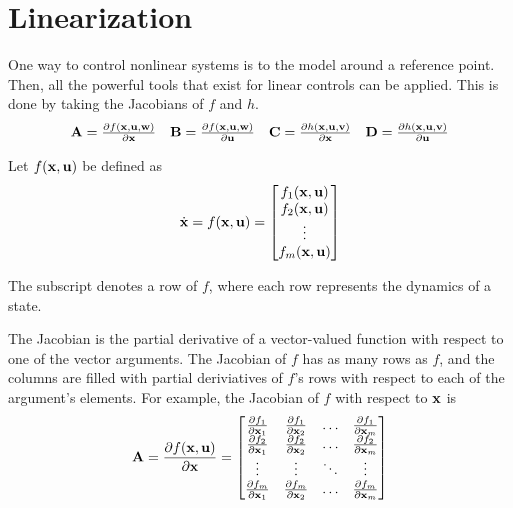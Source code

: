 \section{Linearization}

One way to control nonlinear \glspl{system} is to
 the \gls{model} around a reference point.
Then, all the powerful tools that exist for linear controls can be applied. This
is done by taking the Jacobians of $f$ and $h$.
\begin{align*}
  \begin{array}{cccc}
    \mathbf{A} = \frac{\partial f(\mathbf{x}, \mathbf{u}, \mathbf{w})}{\partial \mathbf{x}} &
    \mathbf{B} = \frac{\partial f(\mathbf{x}, \mathbf{u}, \mathbf{w})}{\partial \mathbf{u}} &
    \mathbf{C} = \frac{\partial h(\mathbf{x}, \mathbf{u}, \mathbf{v})}{\partial \mathbf{x}} &
    \mathbf{D} = \frac{\partial h(\mathbf{x}, \mathbf{u}, \mathbf{v})}{\partial \mathbf{u}}
  \end{array}
\end{align*}

Let $f(\mathbf{x}, \mathbf{u})$ be defined as
\begin{equation*}
  \dot{\mathbf{x}} = f(\mathbf{x}, \mathbf{u}) =
  \begin{bmatrix}
    f_1(\mathbf{x}, \mathbf{u}) \\
    f_2(\mathbf{x}, \mathbf{u}) \\
    \vdots \\
    f_m(\mathbf{x}, \mathbf{u})
  \end{bmatrix}
\end{equation*}

The subscript denotes a row of $f$, where each row represents the dynamics of a
state.

The Jacobian is the partial derivative of a vector-valued function with respect
to one of the vector arguments. The Jacobian of $f$ has as many rows as $f$, and
the columns are filled with partial deriviatives of $f$'s rows with respect to
each of the argument's elements. For example, the Jacobian of $f$ with respect
to $\mathbf{x}$ is
\begin{equation*}
  \mathbf{A} = \frac{\partial f(\mathbf{x}, \mathbf{u})}{\partial \mathbf{x}} =
  \begin{bmatrix}
    \frac{\partial f_1}{\partial \mathbf{x}_1} &
      \frac{\partial f_1}{\partial \mathbf{x}_2} & \hdots &
      \frac{\partial f_1}{\partial \mathbf{x}_m} \\
    \frac{\partial f_2}{\partial \mathbf{x}_1} &
      \frac{\partial f_2}{\partial \mathbf{x}_2} & \hdots &
      \frac{\partial f_2}{\partial \mathbf{x}_m} \\
    \vdots & \vdots & \ddots & \vdots \\
    \frac{\partial f_m}{\partial \mathbf{x}_1} &
      \frac{\partial f_m}{\partial \mathbf{x}_2} & \hdots &
      \frac{\partial f_m}{\partial \mathbf{x}_m}
  \end{bmatrix}
\end{equation*}

